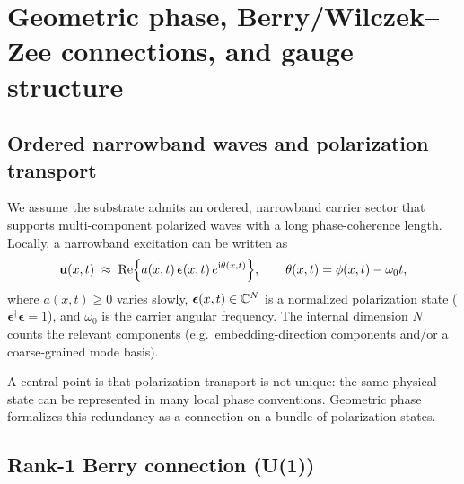 \section{Geometric phase, Berry/Wilczek--Zee connections, and gauge structure}
\label{sec:geophase}

\subsection{Ordered narrowband waves and polarization transport}

We assume the substrate admits an ordered, narrowband carrier sector that supports multi-component polarized
waves with a long phase-coherence length.
Locally, a narrowband excitation can be written as
\begin{equation}
  \mathbf{u}(x,t)\;\approx\;\mathrm{Re}\Big\{ a(x,t)\,\bm{\epsilon}(x,t)\,e^{\mathrm{i}\theta(x,t)} \Big\},
  \qquad
  \theta(x,t)=\phi(x,t)-\omega_0 t,
  \label{eq:quasi-monochromatic}
\end{equation}
where $a(x,t)\ge 0$ varies slowly, $\bm{\epsilon}(x,t)\in\mathbb{C}^{N}$ is a normalized polarization state
($\bm{\epsilon}^\dagger\bm{\epsilon}=1$), and $\omega_0$ is the carrier angular frequency.
The internal dimension $N$ counts the relevant components (e.g.\ embedding-direction components and/or a
coarse-grained mode basis).

A central point is that polarization transport is not unique: the same physical state can be represented in many
local phase conventions.
Geometric phase formalizes this redundancy as a connection on a bundle of polarization states.

\subsection{Rank-1 Berry connection (U(1))}

